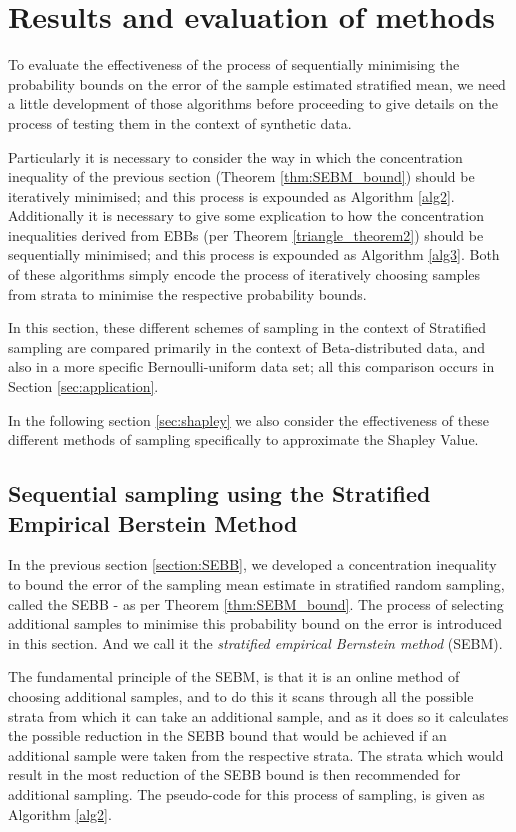 \section{Results and evaluation of methods}\label{section:statistics_results}

To evaluate the effectiveness of the process of sequentially minimising the probability bounds on the error of the sample estimated stratified mean, we need a little development of those algorithms before proceeding to give details on the process of testing them in the context of synthetic data.

Particularly it is necessary to consider the way in which the concentration inequality of the previous section (Theorem \ref{thm:SEBM_bound}) should be iteratively minimised; and this process is expounded as Algorithm \ref{alg2}.
Additionally it is necessary to give some explication to how the concentration inequalities derived from EBBs (per Theorem \ref{triangle_theorem2}) should be sequentially minimised; and this process is expounded as Algorithm \ref{alg3}. Both of these algorithms simply encode the process of iteratively choosing samples from strata to minimise the respective probability bounds.

In this section, these different schemes of sampling in the context of Stratified sampling are compared primarily in the context of Beta-distributed data, and also in a more specific Bernoulli-uniform data set; all this comparison occurs in Section \ref{sec:application}.

In the following section \ref{sec:shapley} we also consider the effectiveness of these different methods of sampling specifically to approximate the Shapley Value.

\subsection{Sequential sampling using the Stratified Empirical Berstein Method} \label{sec:SEBMalgorithm}
In the previous section \ref{section:SEBB}, we developed a concentration inequality to bound the error of the sampling mean estimate in stratified random sampling, called the SEBB - as per Theorem \ref{thm:SEBM_bound}.
The process of selecting additional samples to minimise this probability bound on the error is introduced in this section. And we call it the \textit{stratified empirical Bernstein method} (SEBM).

The fundamental principle of the SEBM, is that it is an online method of choosing additional samples, and to do this it scans through all the possible strata from which it can take an additional sample, and as it does so it calculates the possible reduction in the SEBB bound that would be achieved if an additional sample were taken from the respective strata.
The strata which would result in the most reduction of the SEBB bound is then recommended for additional sampling.
The pseudo-code for this process of sampling, is given as Algorithm \ref{alg2}.



